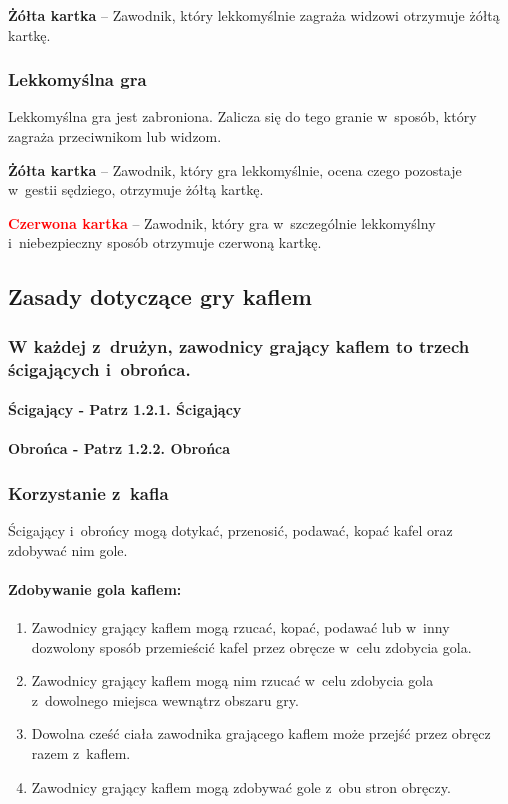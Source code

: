 \documentclass[12pt,a4paper]{article}
\newcommand\redcard[1]{\bgroup\textcolor{red}{\textbf{#1}}}
\newcommand\yellowcard[1]{\bgroup\textcolor{darkyellow}{\textbf{#1}}}
\begin{document}
\yellowcard{Żółta kartka} -- Zawodnik, który lekkomyślnie zagraża widzowi
otrzymuje żółtą kartkę.

\subsubsection{Lekkomyślna gra}

Lekkomyślna gra jest zabroniona. Zalicza się do tego granie w~sposób,
który zagraża przeciwnikom lub widzom.

\yellowcard{Żółta kartka} -- Zawodnik, który gra lekkomyślnie, ocena czego
pozostaje w~gestii sędziego, otrzymuje żółtą kartkę.

\redcard{Czerwona kartka} -- Zawodnik, który gra w~szczególnie lekkomyślny i~niebezpieczny sposób otrzymuje czerwoną kartkę.

\subsection{Zasady dotyczące gry kaflem}

\subsubsection{W każdej z~drużyn, zawodnicy grający kaflem to trzech ścigających
 i~obrońca.}

\paragraph{Ścigający - Patrz 1.2.1. Ścigający}

\paragraph{Obrońca - Patrz 1.2.2. Obrońca}

\subsubsection{Korzystanie z~kafla}

Ścigający i~obrońcy mogą dotykać, przenosić, podawać, kopać kafel oraz
zdobywać nim gole.

\paragraph{Zdobywanie gola kaflem:}

\begin{enumerate}
	\item
	      Zawodnicy grający kaflem mogą rzucać, kopać, podawać lub w~inny
	      dozwolony sposób przemieścić kafel przez obręcze w~celu zdobycia gola.
	\item
	      Zawodnicy grający kaflem mogą nim rzucać w~celu zdobycia gola z~dowolnego
	      miejsca wewnątrz obszaru gry.
	\item
	      Dowolna cześć ciała zawodnika grającego kaflem może przejść przez
	      obręcz razem z~kaflem.
	\item
	      Zawodnicy grający kaflem mogą zdobywać gole z~obu stron obręczy.
\end{enumerate}
\end{document}
